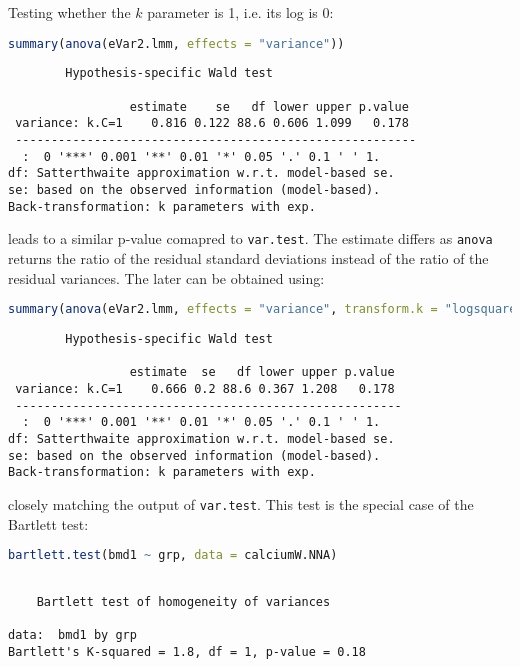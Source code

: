 \documentclass[12pt]{article}
\begin{document}
Testing whether the \(k\) parameter is 1, i.e. its log is 0:
\begin{lstlisting}[language=r,numbers=none]
summary(anova(eVar2.lmm, effects = "variance"))
\end{lstlisting}

\label{}
\begin{verbatim}
		Hypothesis-specific Wald test 

                 estimate    se   df lower upper p.value  
 variance: k.C=1    0.816 0.122 88.6 0.606 1.099   0.178  
 -------------------------------------------------------- 
  :  0 '***' 0.001 '**' 0.01 '*' 0.05 '.' 0.1 ' ' 1.
df: Satterthwaite approximation w.r.t. model-based se. 
se: based on the observed information (model-based). 
Back-transformation: k parameters with exp.
\end{verbatim}


leads to a similar p-value comapred to \texttt{var.test}. The estimate
differs as \texttt{anova} returns the ratio of the residual standard
deviations instead of the ratio of the residual variances. The later
can be obtained using:
\begin{lstlisting}[language=r,numbers=none]
summary(anova(eVar2.lmm, effects = "variance", transform.k = "logsquare"))
\end{lstlisting}

\label{}
\begin{verbatim}
		Hypothesis-specific Wald test 

                 estimate  se   df lower upper p.value  
 variance: k.C=1    0.666 0.2 88.6 0.367 1.208   0.178  
 ------------------------------------------------------ 
  :  0 '***' 0.001 '**' 0.01 '*' 0.05 '.' 0.1 ' ' 1.
df: Satterthwaite approximation w.r.t. model-based se. 
se: based on the observed information (model-based). 
Back-transformation: k parameters with exp.
\end{verbatim}


closely matching the output of \texttt{var.test}. This test is the special
case of the Bartlett test:
\begin{lstlisting}[language=r,numbers=none]
bartlett.test(bmd1 ~ grp, data = calciumW.NNA)
\end{lstlisting}

\label{}
\begin{verbatim}

	Bartlett test of homogeneity of variances

data:  bmd1 by grp
Bartlett's K-squared = 1.8, df = 1, p-value = 0.18
\end{verbatim}
\end{document}
